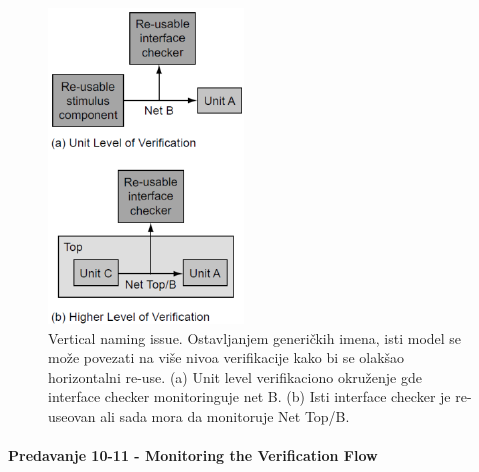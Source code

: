 \documentclass[a4paper, 12pt]{article}
\begin{document}
\begin{figure}[h!]
\centering
\includegraphics[scale=0.8]{img11.png}
\caption{Vertical naming issue. Ostavljanjem generičkih imena, isti model se može povezati na više nivoa verifikacije kako bi se olakšao horizontalni re-use. (a) Unit level verifikaciono okruženje gde interface checker monitoringuje net B. (b) Isti interface checker je re-useovan ali sada mora da monitoruje Net Top/B.}
\label{img11}
\end{figure}


\paragraph{Predavanje 10-11 - Monitoring the Verification Flow}
\end{document}
